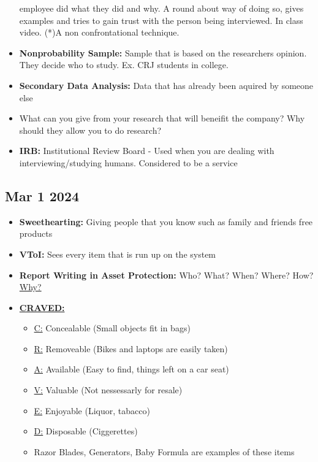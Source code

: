 \documentclass[12pt]{article}
\begin{document}
\begin{itemize}
				employee did what they did and why. A round about way of doing so, gives examples and 
				tries to gain trust with the person being interviewed. In class video. (*)A non confrontational
			   technique.	
		  \item \textbf{Nonprobability Sample:} Sample that is based on the researchers opinion. They decide
				who to study. Ex. CRJ students in college.  
		  \item \textbf{Secondary Data Analysis:} Data that has already been aquired by someone else
		  \item What can you give from your research that will beneifit the company? Why should they allow
				you to do research?  
		  \item \textbf{IRB:} Institutional Review Board - Used when you are dealing with interviewing/studying
				humans. Considered to be a service  
\end{itemize}

\subsection*{Mar 1 2024}

\begin{itemize}
		  \item \textbf{Sweethearting:} Giving people that you know such as family and friends free products  
		  \item \textbf{VToI:} Sees every item that is run up on the system  
		  \item \textbf{Report Writing in Asset Protection:} Who? What? When? Where? How? \underline{Why?}  
		  \item \textbf{\underline{CRAVED:}}
				\begin{itemize}
					\item \underline{C:} Concealable (Small objects fit in bags)
					\item \underline{R:} Removeable (Bikes and laptops are easily taken)
					\item \underline{A:} Available (Easy to find, things left on a car seat)
					\item \underline{V:} Valuable (Not nessessarly for resale)
					\item \underline{E:} Enjoyable (Liquor, tabacco)
					\item \underline{D:} Disposable (Ciggerettes)
					\item Razor Blades, Generators, Baby Formula are examples of these items
			 	\end{itemize}	
\end{itemize}
\end{document}
